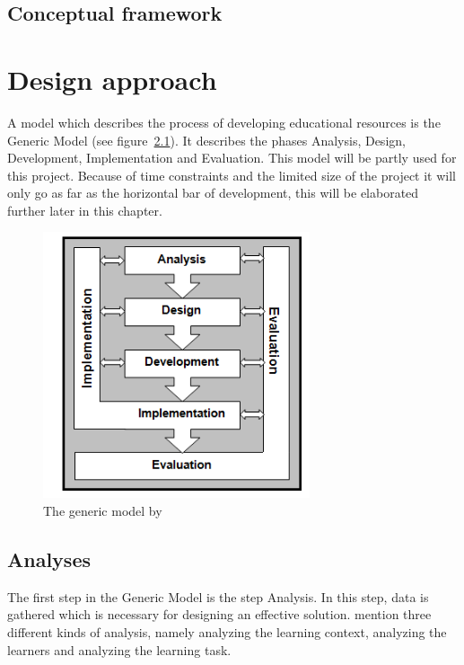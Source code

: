 \documentclass[12pt]{report} %
\begin{document}
\section{Conceptual framework}

\chapter{Design approach}

A model which describes the process of developing educational resources is the Generic Model \cite{genericmodel} (see figure~\ref{fig:genmod}). It describes the phases Analysis, Design, Development, Implementation and Evaluation. This model will be partly used for this project. Because of time constraints and the limited size of the project it will only go as far as the horizontal bar of development, this will be elaborated further later in this chapter.

\begin{figure}[h]
\centering
\includegraphics[width=0.7\textwidth]{genericmodel}
\caption{\footnotesize The generic model by \protect{}\label{fig:genmod}}
\end{figure}

\section{Analyses}

The first step in the Generic Model \cite{genericmodel} is the step Analysis. In this step, data is gathered which is necessary for designing an effective solution.  mention three different kinds of analysis, namely analyzing the learning context, analyzing the learners and analyzing the learning task.
\end{document}
